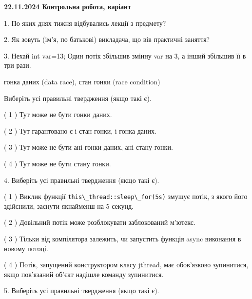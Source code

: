 \documentclass[12pt, ukrainian]{article}
\def\code#1{\Verb!#1!}
\begin{document}
\vspace{4mm}
\newpage
\begin {large}

\textbf{22.11.2024 Контрольна робота, варіант  }\par


{
1. По яких днях тижня відбувались лекції з предмету?



\vspace{5mm}
2. Як зовуть (ім'я, по батькові) викладача, що вів практичні заняття?



\vspace{5mm}
3. Нехай int var=13; Один потік збільшив змінну var на 3, а інший збільшив її в три рази.

гонка даних (data race), стан гонки (race condition)

Виберіть усі правильні твердження (якщо такі є).\par
\vspace{2mm}
( 1 ) Тут може не бути гонки даних.%

( 2 ) Тут гарантовано є і стан гонки, і гонка даних.%

( 3 ) Тут може не бути ані гонки даних, ані стану гонки.%

( 4 ) Тут може не бути стану гонки.%


\vspace{5mm}
4. Виберіть усі правильні твердження (якщо такі є).\par
\vspace{2mm}

( 1 ) Виклик функції \code{this\_thread::sleep\_for(5s)} змушує потік, з якого його здійснили, заснути якнайменш на 5 секунд.%

( 2 ) Довільний потік може розблокувати заблокований м’ютекс.%

( 3 ) Тільки від компілятора залежить, чи запустить функція async виконання в новому потоці.%

( 4 ) Потік, запущений конструктором класу jthread, має обов’язково зупинитися, якщо пов’язаний об’єкт надішле команду зупинитися.%


\vspace{5mm}
5. Виберіть усі правильні твердження (якщо такі є).\par
\vspace{2mm}

}
\end{large}
\end{document}
